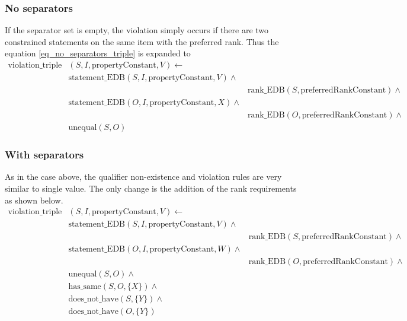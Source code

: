 \documentclass[hyperref,bachelorofscience,fleqn]{cgvpub}
\begin{document}
\subsubsection{No separators}
If the separator set is empty, the violation simply occurs if there are two constrained statements on the same item with the preferred rank. Thus the equation \ref{eq_no_separators_triple} is expanded to
\begin{equation*}
\begin{split}
\text{violation\_triple}&(S, I, \text{propertyConstant}, V) \leftarrow \\
&\text{statement\_EDB}(S, I, \text{propertyConstant}, V) \wedge{} \\
&&\text{rank\_EDB}(S, \text{preferredRankConstant}) \wedge{} \\
&\text{statement\_EDB}(O, I, \text{propertyConstant}, X) \wedge{} \\
&&\text{rank\_EDB}(O, \text{preferredRankConstant}) \wedge{} \\
&\text{unequal}(S, O)
\end{split}
\end{equation*}

\subsubsection{With separators}
As in the case above, the qualifier non-existence and violation rules are very similar to single value. The only change is the addition of the rank requirements as shown below.
\begin{equation*}
\begin{split}
\text{violation\_triple}&(S, I, \text{propertyConstant}, V) \leftarrow \\
&\text{statement\_EDB}(S, I, \text{propertyConstant}, V) \wedge{} \\
&&\text{rank\_EDB}(S, \text{preferredRankConstant}) \wedge{} \\
&\text{statement\_EDB}(O, I, \text{propertyConstant}, W) \wedge{} \\
&&\text{rank\_EDB}(O, \text{preferredRankConstant}) \wedge{} \\
&\text{unequal}(S, O) \wedge{} \\
&\text{has\_same}(S, O, \{X\}) \wedge{} \\
&\text{does\_not\_have}(S, \{Y\}) \wedge{} \\
&\text{does\_not\_have}(O, \{Y\})
\end{split}
\end{equation*}
\end{document}
